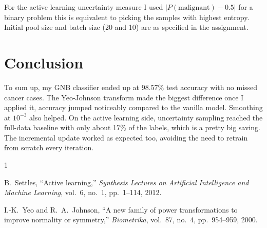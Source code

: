 \documentclass[journal,onecolumn]{IEEEtran}
\begin{document}
For the active learning uncertainty measure I used $|P(\text{malignant}) - 0.5|$ for a binary problem this is equivalent to picking the samples with highest entropy. Initial pool size and batch size (20 and 10) are as specified in the assignment.

\section{Conclusion}

To sum up, my GNB classifier ended up at 98.57\% test accuracy with no missed cancer cases. The Yeo-Johnson transform made the biggest difference once I applied it, accuracy jumped noticeably compared to the vanilla model. Smoothing at $10^{-3}$ also helped. On the active learning side, uncertainty sampling reached the full-data baseline with only about 17\% of the labels, which is a pretty big saving. The incremental update worked as expected too, avoiding the need to retrain from scratch every iteration.

\begin{thebibliography}{1}

B.~Settles, ``Active learning,'' \emph{Synthesis Lectures on Artificial Intelligence and Machine Learning}, vol.~6, no.~1, pp.~1--114, 2012.

I.-K.~Yeo and R.~A.~Johnson, ``A new family of power transformations to improve normality or symmetry,'' \emph{Biometrika}, vol.~87, no.~4, pp.~954--959, 2000.

\end{thebibliography}
\end{document}

